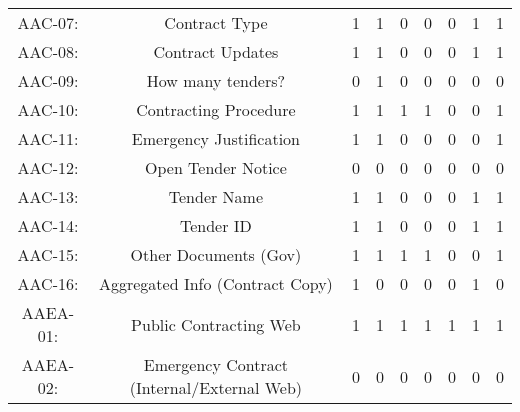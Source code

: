 \documentclass[a4paper, twoside]{report}
\begin{document}
\begin{table}[htbp]
\begin{adjustbox}{max width=\linewidth}
\begin{tabular}{rcccccccc}
    \multicolumn{1}{c}{AAC-07:} & \multicolumn{1}{p{19em}}{Contract Type} & 1     & 1     & 0     & 0     & 0     & 1     & 1 \\
    \multicolumn{1}{c}{AAC-08:} & \multicolumn{1}{p{19em}}{Contract Updates} & 1     & 1     & 0     & 0     & 0     & 1     & 1 \\
    \multicolumn{1}{c}{AAC-09:} & \multicolumn{1}{p{19em}}{How many tenders?} & 0     & 1     & 0     & 0     & 0     & 0     & 0 \\
    \multicolumn{1}{c}{AAC-10:} & \multicolumn{1}{p{19em}}{\cellcolor[rgb]{ .749,  .749,  .749}Contracting Procedure} & \cellcolor[rgb]{ .749,  .749,  .749}1 & \cellcolor[rgb]{ .749,  .749,  .749}1 & \cellcolor[rgb]{ .749,  .749,  .749}1 & \cellcolor[rgb]{ .749,  .749,  .749}1 & \cellcolor[rgb]{ .749,  .749,  .749}0 & \cellcolor[rgb]{ .749,  .749,  .749}0 & \cellcolor[rgb]{ .749,  .749,  .749}1 \\
    \multicolumn{1}{c}{AAC-11:} & \multicolumn{1}{p{19em}}{\cellcolor[rgb]{ .749,  .749,  .749}Emergency Justification} & \cellcolor[rgb]{ .749,  .749,  .749}1 & \cellcolor[rgb]{ .749,  .749,  .749}1 & \cellcolor[rgb]{ .749,  .749,  .749}0 & \cellcolor[rgb]{ .749,  .749,  .749}0 & \cellcolor[rgb]{ .749,  .749,  .749}0 & \cellcolor[rgb]{ .749,  .749,  .749}0 & \cellcolor[rgb]{ .749,  .749,  .749}1 \\
    \multicolumn{1}{c}{AAC-12:} & \multicolumn{1}{p{19em}}{Open Tender Notice} & 0     & 0     & 0     & 0     & 0     & 0     & 0 \\
    \multicolumn{1}{c}{AAC-13:} & \multicolumn{1}{p{19em}}{Tender Name} & 1     & 1     & 0     & 0     & 0     & 1     & 1 \\
    \multicolumn{1}{c}{AAC-14:} & \multicolumn{1}{p{19em}}{Tender ID} & 1     & 1     & 0     & 0     & 0     & 1     & 1 \\
    \multicolumn{1}{c}{AAC-15:} & \multicolumn{1}{p{19em}}{Other Documents (Gov)} & 1     & 1     & 1     & 1     & 0     & 0     & 1 \\
    \multicolumn{1}{c}{AAC-16:} & \multicolumn{1}{p{19em}}{Aggregated Info (Contract Copy)} & 1     & 0     & 0     & 0     & 0     & 1     & 0 \\
    \midrule
    \multicolumn{1}{c}{AAEA-01:} & \multicolumn{1}{p{19em}}{Public Contracting Web} & 1     & 1     & 1     & 1     & 1     & 1     & 1 \\
    \multicolumn{1}{c}{AAEA-02:} & \multicolumn{1}{p{19em}}{\cellcolor[rgb]{ .749,  .749,  .749}Emergency Contract (Internal/External Web)} & \cellcolor[rgb]{ .749,  .749,  .749}0 & \cellcolor[rgb]{ .749,  .749,  .749}0 & \cellcolor[rgb]{ .749,  .749,  .749}0 & \cellcolor[rgb]{ .749,  .749,  .749}0 & \cellcolor[rgb]{ .749,  .749,  .749}0 & \cellcolor[rgb]{ .749,  .749,  .749}0 & \cellcolor[rgb]{ .749,  .749,  .749}0 \\

\end{tabular}
\end{adjustbox}
\end{table}
\end{document}
